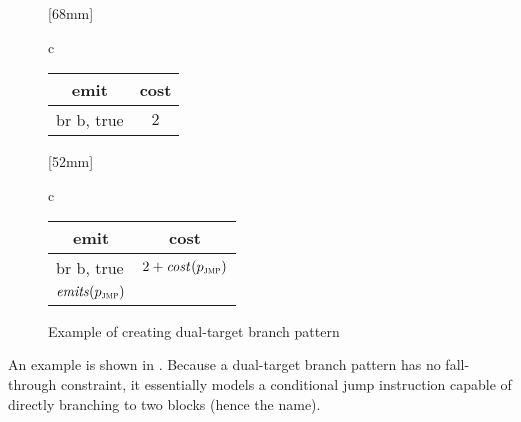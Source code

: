 \begin{figure}
                [68mm]%
                {%
                  \begin{tabular}{c}
                    \\[.5\betweensubfigures]
                    \figureFont\figureFontSize%
                    \begin{tabular}{lc}
                      \toprule
                        \multicolumn{1}{c}{\tabhead emit} & \tabhead cost\\
                      \midrule
                        {\instrFont br b, true} & $2$\\
                      \bottomrule
                    \end{tabular}%
                  \end{tabular}%
                }%
  \hfill%
                [52mm]%
                {%
                  \begin{tabular}{c}
                    \newcommand{\fallthruString}{}%
                    \\[.5\betweensubfigures]
                    \figureFont\figureFontSize%
                    \begin{tabular}{lc}
                      \toprule
                        \multicolumn{1}{c}{\tabhead emit} & \tabhead cost\\
                      \midrule
                        {\instrFont br b, true}
                      & $2 + \operatorname{\textrm{\textit{cost}}}\hspace{.4pt}(p_{\textsc{jmp}})$\\
                        $\operatorname{\textrm{\textit{emits}}}(p_{\textsc{jmp}})$
                      & \\
                      \bottomrule
                    \end{tabular}%
                  \end{tabular}%
                }

  \caption{Example of creating dual-target branch pattern}%
\end{figure}
%
An example is shown in .
%
Because a \gls{dual-target branch pattern} has no \gls{fall-through}
\gls{constraint}, it essentially models a conditional jump \gls{instruction}
capable of directly branching to two \glspl{block} (hence the name).

